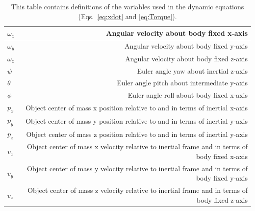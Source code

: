 \documentclass{article}
\begin{document}
\begin{table}[H]
\centering
\begin{tabularx}{0.99\textwidth}{|X|X|}%
 \hline
 $\omega_x$ & \multicolumn{1}{|r|}{Angular velocity about body fixed x-axis} \\%
 \hline
 $\omega_y$ & \multicolumn{1}{|r|}{Angular velocity about body fixed y-axis} \\%
 \hline
 $\omega_z$ & \multicolumn{1}{|r|}{Angular velocity about body fixed z-axis} \\%
 \hline
 $\psi$  & \multicolumn{1}{|r|}{Euler angle yaw about inertial z-axis} \\%
 \hline
 $\theta$  & \multicolumn{1}{|r|}{Euler angle pitch about intermediate y-axis} \\%
 \hline
 $\phi$  & \multicolumn{1}{|r|}{Euler angle roll about body fixed x-axis} \\%
 \hline  
 $p_x$  & \multicolumn{1}{|r|}{Object center of mass x position relative to and in terms of inertial x-axis} \\%
 \hline 
 $p_y$  & \multicolumn{1}{|r|}{Object center of mass y position relative to and in terms of inertial y-axis} \\%
 \hline 
 $p_z$  & \multicolumn{1}{|r|}{Object center of mass z position relative to and in terms of inertial y-axis} \\%
 \hline
 $v_x$  & \multicolumn{1}{|r|}{Object center of mass x velocity relative to inertial frame and in terms of body fixed x-axis} \\%
 \hline 
 $v_y$  & \multicolumn{1}{|r|}{Object center of mass y velocity relative to inertial frame and in terms of body fixed y-axis} \\%
 \hline
 $v_z$  & \multicolumn{1}{|r|}{Object center of mass z velocity relative to inertial frame and in terms of body fixed z-axis} \\%
 \hline  
\end{tabularx}
\caption{This table contains definitions of the variables used in the dynamic equations (Eqs.~\ref{eq:xdot} and \ref{eq:Torque}).}
\label{tab:variable_definition}
\end{table}
\end{document}
